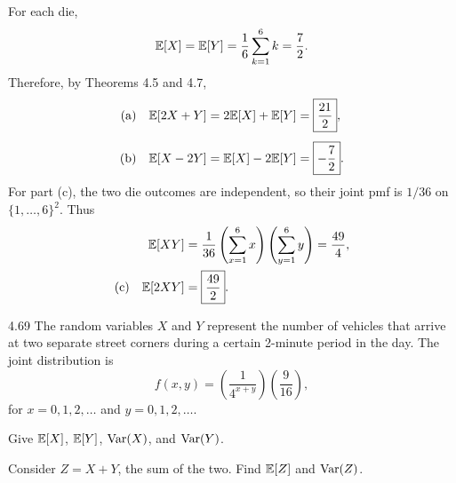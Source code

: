 \documentclass[11pt,oneside]{article}
\begin{document}
\begin{solution}
For each die,
\[
    \mathbb{E}[X]=\mathbb{E}[Y]=\frac16\sum_{k=1}^6 k=\frac72.
\]
Therefore, by Theorems 4.5 and 4.7,
\[
\begin{aligned}
    \textup{(a)}\quad
    \mathbb{E}[2X+Y]
    &=2\mathbb{E}[X]+\mathbb{E}[Y]
      =\boxed{\frac{21}{2}},\\[0.4em]
    \textup{(b)}\quad
    \mathbb{E}[X-2Y]
    &=\mathbb{E}[X]-2\mathbb{E}[Y]
      =\boxed{-\frac72}.
\end{aligned}
\]
For part (c), the two die outcomes are independent, so their joint pmf is $1/36$ on $\{1,\ldots,6\}^2$. Thus
\[
\begin{aligned}
    \mathbb{E}[XY]
    &=\frac1{36}
      \left(\sum_{x=1}^6x\right)
      \left(\sum_{y=1}^6y\right)
      =\frac{49}{4},\\
    \textup{(c)}\quad
    \mathbb{E}[2XY]
    &=\boxed{\frac{49}{2}}.
\end{aligned}
\]
\end{solution}

\begin{exercise}{4.69}
The random variables $X$ and $Y$ represent the number of vehicles that arrive at two separate street corners during a certain 2-minute period in the day. The joint distribution is
\[
    f(x,y)=\left(\frac{1}{4^{x+y}}\right)\left(\frac{9}{16}\right),
\]
for $x=0,1,2,\ldots$ and $y=0,1,2,\ldots$.
\begin{exercisesubparts}
    \item Give $\mathbb{E}[X]$, $\mathbb{E}[Y]$, $\operatorname{Var}(X)$, and $\operatorname{Var}(Y)$.
    \item Consider $Z=X+Y$, the sum of the two. Find $\mathbb{E}[Z]$ and $\operatorname{Var}(Z)$.
\end{exercisesubparts}
\end{exercise}
\end{document}

